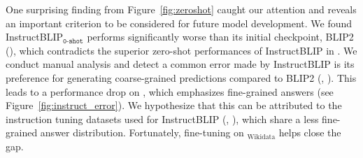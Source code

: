 \documentclass[11pt]{article}
\begin{document}
One surprising finding from Figure~\ref{fig:zeroshot} caught our attention and reveals an important criterion to be considered for future model development.
We found InstructBLIP$_{\texttt{0-shot}}$ performs significantly worse than its initial checkpoint, BLIP2 (), which contradicts the superior zero-shot performances of InstructBLIP in \citet{dai2023instructblip}.
We conduct manual analysis and detect a common error made by InstructBLIP is its preference for generating coarse-grained predictions compared to BLIP2 (\eg, ).
This leads to a performance drop on \infoseek, which emphasizes fine-grained answers (see Figure~\ref{fig:instruct_error}). 
We hypothesize that this can be attributed to the instruction tuning datasets used for InstructBLIP (\eg, ), which share a less fine-grained answer distribution.
Fortunately, fine-tuning on \infoseek$_\text{Wikidata}$ helps close the gap.
\end{document}
